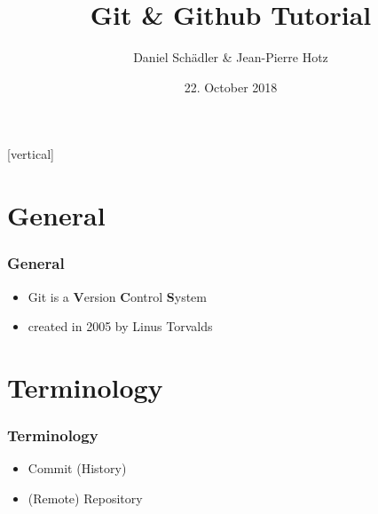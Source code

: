 \documentclass{beamer}
\begin{document}
	\title{Git \& Github Tutorial}   
	\author{Daniel Schädler \& Jean-Pierre Hotz} 
	\date{22. October 2018}
	
	\subtitle{} %
	\subject{Software-Engineering}%
	\keywords{}%
	
	[vertical]
	
	\begin{frame}
		\titlepage
	\end{frame}

	\section{General}
	\begin{frame}
		\frametitle{General}\pause
		\begin{itemize}
			\item Git is a \textbf{V}ersion \textbf{C}ontrol \textbf{S}ystem \pause
			\item created in 2005 by Linus Torvalds
		\end{itemize}
	\end{frame}

	\section{Terminology}
	\begin{frame}
		\frametitle{Terminology}\pause
		\begin{itemize}
			\item Commit (History) \pause
			\item (Remote) Repository
		\end{itemize}
	\end{frame}
\end{document}
